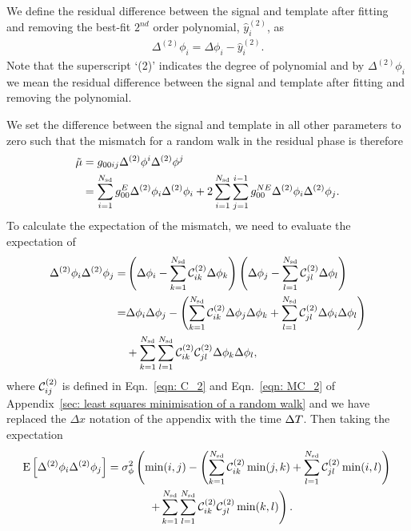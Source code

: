 \documentclass[../full_thesis/full_thesis.tex]{subfiles}
\begin{document}
We define the residual difference between the signal and template
after fitting and removing the best-fit $2^{nd}$ order polynomial, $\hat{y}_i^{(2)}$, as
\begin{align}
\Delta^{(2)}\phi_i = \Delta\phi_i - \hat{y}_i^{(2)}.
\label{eqn: D2phi}
\end{align}
Note that the superscript `(2)' indicates the degree of polynomial and by
$\Delta^{(2)}\phi_i$ we mean the residual difference between the signal and
template after fitting and removing the polynomial.

We set the difference between the signal and template in all other parameters
to zero such that the mismatch for a random walk in the residual phase is
therefore
\begin{align}
\tilde{\mu} & = g_{0 0 i j} \Delta^{(2)}\phi^{i}\Delta^{(2)}\phi^{j} \\
& = \sum_{i=1}^{N_{\textrm{sd}}}g_{00}^{E} \Delta^{(2)}\phi_{i}\Delta^{(2)}\phi_{i}
+ 2 \sum_{i=1}^{N_{\textrm{sd}}}\sum_{j=1}^{i-1}g_{00}^{NE}\Delta^{(2)}\phi_{i}\Delta^{(2)}\phi_{j}.
\label{eqn: 4202540871}
\end{align}
To calculate the expectation of the mismatch, we need to evaluate the
expectation of
\begin{align}
\Delta^{(2)}\phi_{i}\Delta^{(2)}\phi_{j} = & \left(\Delta\phi_{i}
- \sum_{k=1}^{N_{\textrm{sd}}}\mathcal{C}^{(2)}_{ik}\Delta\phi_{k}\right)
 \left(\Delta\phi_{j} - \sum_{l=1}^{N_{\textrm{sd}}}\mathcal{C}^{(2)}_{jl}\Delta\phi_{l}\right) \\
= & \Delta\phi_{i}\Delta\phi_{j} -
\left(\sum_{k=1}^{N_{\textrm{sd}}}\mathcal{C}^{(2)}_{ik} \Delta\phi_{j}\Delta\phi_{k}
+ \sum_{l=1}^{N_{\textrm{sd}}}\mathcal{C}^{(2)}_{jl}\Delta\phi_{i}\Delta\phi_{l}\right) \nonumber \\
& +
\sum_{k=1}^{N_{\textrm{sd}}}\sum_{l=1}^{N_{\textrm{sd}}}\mathcal{C}^{(2)}_{ik}\mathcal{C}^{(2)}_{jl} \Delta\phi_{k}\Delta\phi_{l},
\end{align}
where $\mathcal{C}^{(2)}_{ij}$ is defined in Eqn.~\eqref{eqn: C_2} and Eqn.~\eqref{eqn: MC_2} of
Appendix~\ref{sec: least squares minimisation of a random walk} and we have
replaced the $\Delta x$ notation of the appendix with the time $\Delta T$. Then
taking the expectation
\begin{align}
\E{\Delta^{(2)}\phi_{i}\Delta^{(2)}\phi_{j}} & =
\sigma^{2}_{\phi} \left(\min(i, j) - \left(\s{k=1}{\Nsd}\CT_{ik} \min(j, k)
+ \s{l=1}{\Nsd}\CT_{jl}\min(i, l) \right)\right. \notag \\
& \hspace{13mm} \left. + \s{k=1}{\Nsd}\s{l=1}{\Nsd}\CT_{ik}\CT_{jl}\min(k, l)\right).
\label{eqn: expected mismatch dP0idP0j_k2}
\end{align}
\end{document}
